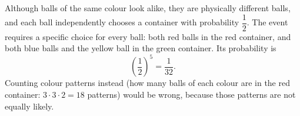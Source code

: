 Although balls of the same colour look alike, they are physically different balls, and each ball independently chooses a container with probability $\dfrac{1}{2}$. The event requires a specific choice for every ball: both red balls in the red container, and both blue balls and the yellow ball in the green container. Its probability is
\[
\left(\dfrac{1}{2}\right)^5=\boxed{\dfrac{1}{32}}.
\]
Counting colour patterns instead (how many balls of each colour are in the red container: $3\cdot3\cdot2=18$ patterns) would be wrong, because those patterns are not equally likely.
